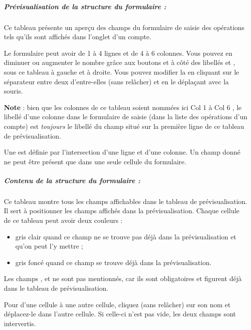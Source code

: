 \subparagraph{Prévisualisation de la structure du formulaire :\label{setup-form-content-display}}

Ce tableau présente un aperçu des champs du formulaire de saisie des opérations tels qu'ils sont affichés dans l'onglet  d'un compte.

Le formulaire peut avoir de 1 à 4 lignes et de 4 à 6 colonnes. Vous pouvez en diminuer ou augmenter le nombre grâce aux boutons  et  à côté des libellés  et , sous ce tableau à gauche et à droite. Vous pouvez modifier la  en cliquant sur le séparateur entre deux d'entre-elles (sans relâcher) et en le déplaçant avec la souris.

\textbf{Note} : bien que les colonnes de ce tableau soient nommées ici \og Col 1 \fg{} à \og Col 6 \fg{}, le libellé d'une colonne dans le formulaire de saisie (dans la liste des opérations d'un compte) est \emph{toujours} le libellé du champ situé sur la première ligne de ce tableau de prévisualisation.
 
Une  est définie par l'intersection d'une ligne et d'une colonne. Un champ donné ne peut être présent que dans une seule cellule du formulaire.


\subparagraph{Contenu de la structure du formulaire :\label{setup-form-content-fields}}

Ce tableau montre tous les champs affichables dans le tableau de prévisualisation. Il sert à positionner les champs affichés dans la prévisualisation. Chaque cellule de ce tableau peut avoir deux couleurs :

\begin{itemize}
	\item gris clair quand ce champ ne se trouve pas déjà dans la prévisualisation et qu'on peut l'y mettre ;
	\item gris foncé quand ce champ se trouve déjà dans la prévisualisation.
\end{itemize}

Les champs ,  et  ne sont pas mentionnés, car ils sont obligatoires et figurent déjà dans le tableau de prévisualisation.

Pour  d'une cellule à une autre cellule, cliquez (sans relâcher) sur son nom et déplacez-le dans l'autre cellule. Si celle-ci n'est pas vide, les deux champs sont intervertis.

